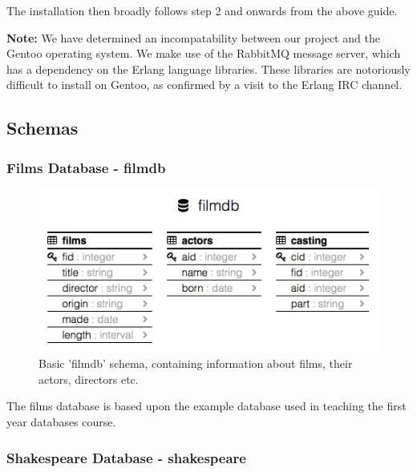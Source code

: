 \documentclass[a4paper, 11pt]{article}
\begin{document}
  The installation then broadly follows step 2 and onwards from the above
  guide. 

  \textbf{Note:} We have determined an incompatability between our project and
  the Gentoo operating system. We make use of the RabbitMQ message server,
  which has a dependency on the Erlang language libraries. These libraries
  are notoriously difficult to install on Gentoo, as confirmed by a visit to
  the Erlang IRC channel.

  \subsection{Schemas}

    \subsubsection{Films Database - filmdb}
    \label{sec:appfilmdb}

      \begin{figure}[H]
        \includegraphics[width=\textwidth]{images/site_schema.png}
        \caption{Basic 'filmdb' schema, containing information about films,
        their actors, directors etc.}
      \end{figure}

      The films database is based upon the example database used in teaching
      the first year databases course.

    \subsubsection{Shakespeare Database - shakespeare}
\end{document}
